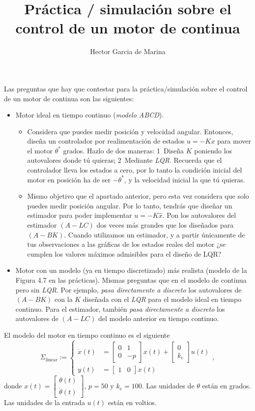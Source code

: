 \documentclass[11pt,a4paper,titlepage]{article}
\title{Práctica / simulación sobre el control de un motor de continua}
\author{Hector Garcia de Marina}
\begin{document}
Las preguntas que hay que contestar para la práctica/simulación sobre el control de un motor de continua son las siguientes:

\begin{itemize}
	\item Motor ideal en tiempo continuo (\emph{modelo ABCD}).
		\begin{itemize}
			\item Considera que puedes medir posición y velocidad angular. Entonces, diseña un controlador por realimentación de estados $u = -Kx$ para mover el motor $\theta^*$ grados. Hazlo de dos maneras: 1\ Diseña $K$ poniendo los autovalores donde tú quieras; 2\ Mediante \emph{LQR}. Recuerda que el controlador lleva los estados a cero, por lo tanto la condición inicial del motor en posición ha de ser $-\theta^*$, y la velocidad inicial la que tú quieras.

			\item Mismo objetivo que el apartado anterior, pero esta vez considera que solo puedes medir posición angular. Por lo tanto, tendrás que diseñar un estimador para poder implementar $u = -K\hat x$. Pon los autovalores del estimador $(A-LC)$ dos veces más grandes que los diseñados para $(A-BK)$. Cuando utilizamos un estimador, y a partir únicamente de tus observaciones a las gráficas de los estados reales del motor ¿se cumplen los valores máximos admisibles para el diseño de LQR?
		\end{itemize}
	\item Motor con un modelo (ya en tiempo discretizado) más realista (modelo de la Figura 4.7 en las prácticas). Mismas preguntas que en el modelo de continua pero sin \emph{LQR}. Por ejemplo, \emph{pasa directamente a discreto} los autovalores de $(A-BK)$ con la $K$ diseñada con el \emph{LQR} para el modelo ideal en tiempo continuo. Para el estimador, también \emph{pasa directamente a discreto} los autovalores de $(A-LC)$ del modelo anterior en tiempo continuo.
\end{itemize}

El modelo del motor en tiempo continuo es el siguiente
\begin{equation}
	\Sigma_{\text{linear}} := \begin{cases}
		\dot x(t) &= \begin{bmatrix}0 & 1 \\ 0 & -p\end{bmatrix}x(t) + \begin{bmatrix}0 \\ k_e\end{bmatrix} u(t) \\
			y(t) &= \begin{bmatrix}1 & 0\end{bmatrix}x(t)
	\end{cases},
\label{eq: sigmalin}
\end{equation}
donde $x(t) = \begin{bmatrix}\theta(t) \\ \dot\theta(t) \end{bmatrix}$, $p = 50$ y $k_e = 100$. Las unidades de $\theta$ están en grados. Las unidades de la entrada $u(t)$ están en voltios.
\end{document}
